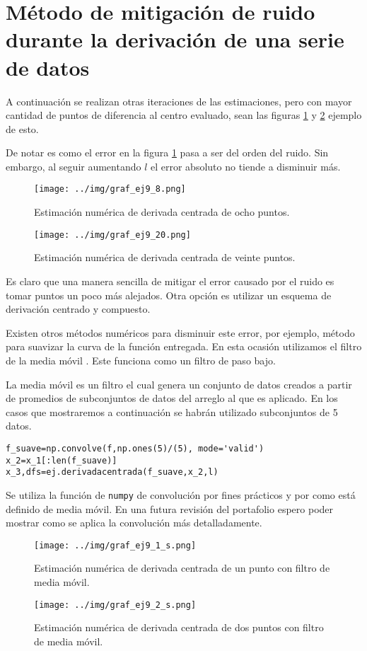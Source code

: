 \documentclass[../portafolio.tex]{subfiles}
\begin{document}
\section{Método de mitigación de ruido durante la derivación de una serie de datos}

A continuación se realizan otras iteraciones de las estimaciones, pero con mayor cantidad de puntos de diferencia al centro evaluado, sean las figuras \ref{g2_ej9:fig:graf_1} y \ref{g2_ej9:fig:graf_2} ejemplo de esto.

De notar es como el error en la figura \ref{g2_ej9:fig:graf_1} pasa a ser del orden del ruido. Sin embargo, al seguir aumentando $l$ el error absoluto no tiende a disminuir más.



\begin{figure}
\centering
\texttt{[image: ../img/graf\_ej9\_8.png]}
\caption{Estimación numérica de derivada centrada de ocho puntos.} \label{g2_ej9:fig:graf_1}
\end{figure}

\begin{figure}
\centering
\texttt{[image: ../img/graf\_ej9\_20.png]}
\caption{Estimación numérica de derivada centrada de veinte puntos.} \label{g2_ej9:fig:graf_2}
\end{figure}

Es claro que una manera sencilla de mitigar el error causado por el ruido es tomar puntos un poco más alejados. Otra opción es utilizar un esquema de derivación centrado y compuesto.

Existen otros métodos numéricos para disminuir este error, por ejemplo, método para suavizar la curva de la función entregada. En esta ocasión utilizamos el filtro de la media móvil \citep{gaussianwaves2010}. Este funciona como un filtro de paso bajo. 

La media móvil es un filtro el cual genera un conjunto de datos creados a partir de promedios de subconjuntos de datos del arreglo al que es aplicado. En los casos que mostraremos a continuación se habrán utilizado subconjuntos de 5 datos.

\begin{verbatim}
f_suave=np.convolve(f,np.ones(5)/(5), mode='valid')
x_2=x_1[:len(f_suave)]
x_3,dfs=ej.derivadacentrada(f_suave,x_2,l)
\end{verbatim}
Se utiliza la función de \texttt{numpy} de convolución por fines prácticos y por como está definido de media móvil. En una futura revisión del portafolio espero poder mostrar como se aplica la convolución más detalladamente.
\begin{figure}
\centering
\texttt{[image: ../img/graf\_ej9\_1\_s.png]}
\caption{Estimación numérica de derivada centrada de un punto con filtro de media móvil.} \label{g2_ej9:fig:graf_1s}
\end{figure}
\begin{figure}
\centering
\texttt{[image: ../img/graf\_ej9\_2\_s.png]}
\caption{Estimación numérica de derivada centrada de dos puntos con filtro de media móvil.} \label{g2_ej9:fig:graf_2s}
\end{figure}
\end{document}
